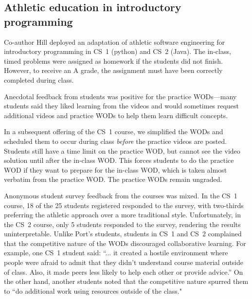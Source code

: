 \subsection{Athletic education in introductory programming}

Co-author Hill deployed an adaptation of athletic software engineering for introductory programming in CS~1 (python) and CS~2 (Java). The in-class, timed problems were assigned as homework if the students did not finish. However, to receive an A grade, the assignment must have been correctly completed during class. %


Anecdotal feedback from students was positive for the practice WODs---many students said they liked learning from the videos and would sometimes request additional videos and practice WODs to help them learn difficult concepts. %

In a subsequent offering of the CS~1 course, we simplified the WODs and scheduled them to occur during class \emph{before} the practice videos are posted. Students still have a time limit on the practice WOD, but cannot see the video solution until after the in-class WOD. This forces students to do the practice WOD if they want to prepare for the in-class WOD, which is taken almost verbatim from the practice WOD. The practice WODs remain ungraded.

Anonymous student survey feedback from the courses was mixed. In the CS~1 course, 18 of the 25 students registered responded to the survey, with two-thirds preferring the athletic approach over a more traditional style. Unfortunately, in the CS~2 course, only 5 students responded to the survey, rendering the results uninterpretable.  Unlike Port's students, students in CS~1 and CS~2 complained that the competitive nature of the WODs discouraged collaborative learning. For example, one CS~1 student said: ``... it created a hostile environment where people were afraid to admit that they didn't understand course material outside of class. Also, it made peers less likely to help each other or provide advice.''  On the other hand, another students noted that the competitive nature spurred them to ``do additional work using resources outside of the class."

